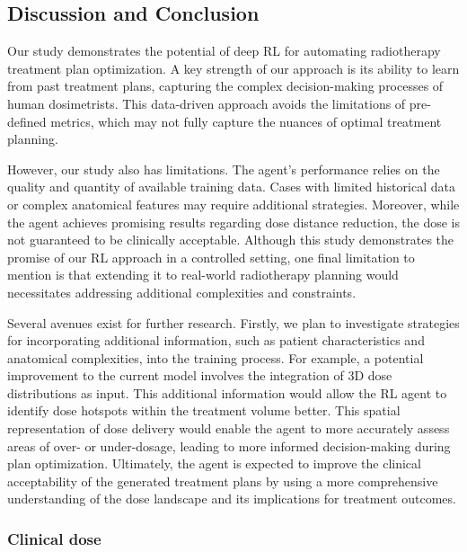 \subsection{Discussion and Conclusion}
Our study demonstrates the potential of deep RL for automating radiotherapy treatment plan optimization.
A key strength of our approach is its ability to learn from past treatment plans, capturing the complex decision-making processes of human dosimetrists.
This data-driven approach avoids the limitations of pre-defined metrics, which may not fully capture the nuances of optimal treatment planning.

However, our study also has limitations.
The agent's performance relies on the quality and quantity of available training data.
Cases with limited historical data or complex anatomical features may require additional strategies.
Moreover, while the agent achieves promising results regarding dose distance reduction, the dose is not guaranteed to be clinically acceptable.
Although this study demonstrates the promise of our RL approach in a controlled setting, one final limitation to mention is that extending it to real-world radiotherapy planning would necessitates addressing additional complexities and constraints.

Several avenues exist for further research.
Firstly, we plan to investigate strategies for incorporating additional information, such as patient characteristics and anatomical complexities, into the training process.
For example, a potential improvement to the current model involves the integration of 3D dose distributions as input.
This additional information would allow the RL agent to identify dose hotspots within the treatment volume better.
This spatial representation of dose delivery would enable the agent to more accurately assess areas of over- or under-dosage, leading to more informed decision-making during plan optimization.
Ultimately, the agent is expected to improve the clinical acceptability of the generated treatment plans by using a more comprehensive understanding of the dose landscape and its implications for treatment outcomes.

\subsubsection*{Clinical dose}

